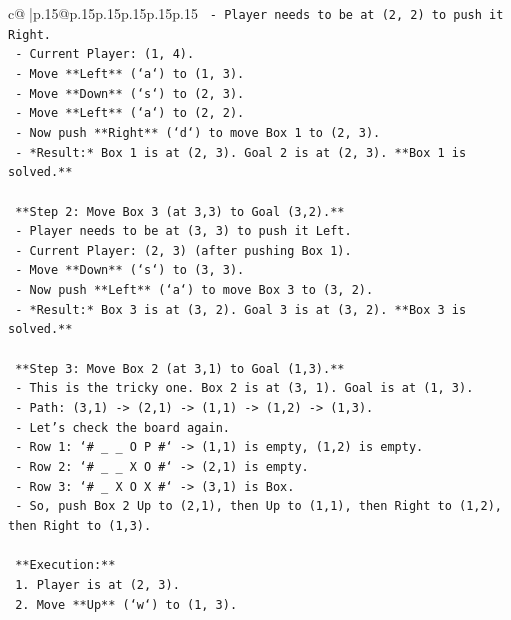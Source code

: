 \documentclass{article}
\begin{document}
{\begin{supertabular}{c@{$\;$}|p{.15\linewidth}@{}p{.15\linewidth}p{.15\linewidth}p{.15\linewidth}p{.15\linewidth}p{.15\linewidth}}
{{{\texttt{    {-} Player needs to be at (2, 2) to push it Right.} \\
\texttt{    {-} Current Player: (1, 4).} \\
\texttt{    {-} Move **Left** (`a`) to (1, 3).} \\
\texttt{    {-} Move **Down** (`s`) to (2, 3).} \\
\texttt{    {-} Move **Left** (`a`) to (2, 2).} \\
\texttt{    {-} Now push **Right** (`d`) to move Box 1 to (2, 3).} \\
\texttt{    {-} *Result:* Box 1 is at (2, 3). Goal 2 is at (2, 3). **Box 1 is solved.**} \\
\\ 
\texttt{    **Step 2: Move Box 3 (at 3,3) to Goal (3,2).**} \\
\texttt{    {-} Player needs to be at (3, 3) to push it Left.} \\
\texttt{    {-} Current Player: (2, 3) (after pushing Box 1).} \\
\texttt{    {-} Move **Down** (`s`) to (3, 3).} \\
\texttt{    {-} Now push **Left** (`a`) to move Box 3 to (3, 2).} \\
\texttt{    {-} *Result:* Box 3 is at (3, 2). Goal 3 is at (3, 2). **Box 3 is solved.**} \\
\\ 
\texttt{    **Step 3: Move Box 2 (at 3,1) to Goal (1,3).**} \\
\texttt{    {-} This is the tricky one. Box 2 is at (3, 1). Goal is at (1, 3).} \\
\texttt{    {-} Path: (3,1) {-}> (2,1) {-}> (1,1) {-}> (1,2) {-}> (1,3).} \\
\texttt{    {-} Let's check the board again.} \\
\texttt{    {-} Row 1: `\# \_ \_ O P \#` {-}> (1,1) is empty, (1,2) is empty.} \\
\texttt{    {-} Row 2: `\# \_ \_ X O \#` {-}> (2,1) is empty.} \\
\texttt{    {-} Row 3: `\# \_ X O X \#` {-}> (3,1) is Box.} \\
\texttt{    {-} So, push Box 2 Up to (2,1), then Up to (1,1), then Right to (1,2), then Right to (1,3).} \\
\\ 
\texttt{    **Execution:**} \\
\texttt{    1.  Player is at (2, 3).} \\
\texttt{    2.  Move **Up** (`w`) to (1, 3).} \\
}}}
\end{supertabular}}
\end{document}
